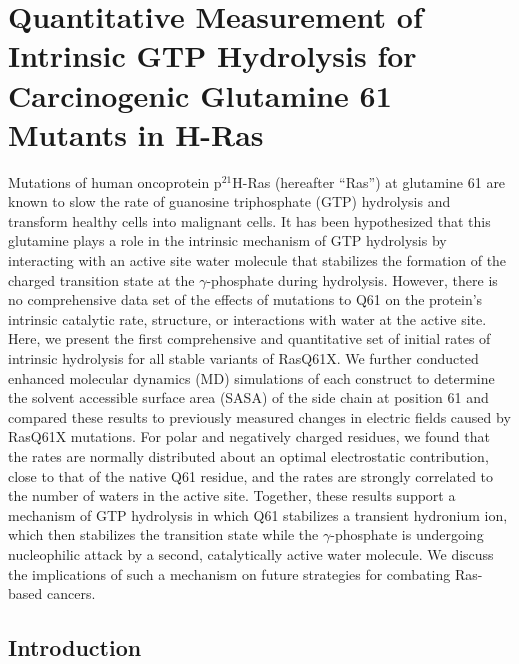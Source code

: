 \chapter{Quantitative Measurement of Intrinsic GTP Hydrolysis for
Carcinogenic Glutamine 61 Mutants in H-Ras} \label{ras}

\newcommand{\RalBSCN}{{Ral$\beta$I18C$_{\text{SCN}}$}}
\newcommand{\RalB}{{Ral$\beta$}}


Mutations of human oncoprotein p$^{21}$H-Ras (hereafter ``Ras'') at glutamine 61 are known to slow the rate of guanosine triphosphate (GTP) hydrolysis and transform healthy cells into malignant cells. 
It has been hypothesized that this glutamine plays a role in the intrinsic mechanism of GTP hydrolysis by interacting with an active site water molecule that stabilizes the formation of the charged transition state at the $\gamma$-phosphate during hydrolysis.
However, there is no comprehensive data set of the effects of mutations to Q61 on the protein's intrinsic catalytic rate, structure, or interactions with water at the active site. 
Here, we present the first comprehensive and quantitative set of initial rates of intrinsic hydrolysis for all stable variants of RasQ61X. 
We further conducted enhanced molecular dynamics (MD) simulations of each construct to determine the solvent accessible surface area (SASA) of the side chain at position 61 and compared these results to previously measured changes in electric fields caused by RasQ61X mutations. 
For polar and negatively charged residues, we found that the rates are normally distributed about an optimal electrostatic contribution, close to that of the native Q61 residue, and the rates are strongly correlated to the number of waters in the active site. 
Together, these results support a mechanism of GTP hydrolysis in which Q61 stabilizes a transient hydronium ion, which then stabilizes the transition state while the $\gamma$-phosphate is undergoing nucleophilic attack by a second, catalytically active water molecule. 
We discuss the implications of such a mechanism on future strategies for combating Ras-based cancers.

\section{Introduction} \label{pKa-intro}

